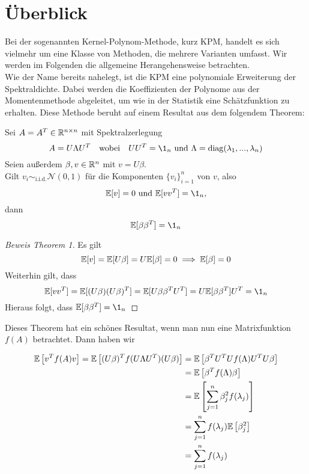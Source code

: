 \section{Überblick}
Bei der sogenannten Kernel-Polynom-Methode, kurz KPM, handelt es sich vielmehr um eine Klasse von Methoden, die mehrere Varianten umfasst.
Wir werden im Folgenden die allgemeine Herangehensweise betrachten.\\
Wie der Name bereits nahelegt, ist die KPM eine polynomiale Erweiterung der Spektraldichte.
Dabei werden die Koeffizienten der Polynome aus der Momentenmethode abgeleitet, um wie in der Statistik eine Schätzfunktion zu erhalten.
Diese Methode beruht auf einem Resultat aus dem folgendem Theorem:


\begin{theorem}
    Sei $A = A^T \in \mathbb{R}^{n \times n}$ mit Spektralzerlegung
    $$A = U \Lambda U^T \quad \text{wobei} \quad UU^T = \1_n \text{ und } \Lambda = \diag(\lambda_1, ..., \lambda_n)$$ 
    Seien außerdem $\beta, v \in \mathbb{R}^n$ mit $v = U\beta$.\\
    Gilt $v_i \sim_\text{i.i.d.} \mathcal{N}(0, 1)$ für die Komponenten $\{v_i\}_{i = 1}^n$ von $v$, also
    \begin{equation} \label{eq:normalverteiltervektor}
        \E[v] = 0 \text{ und } \E[vv^T] = \1_n \text{,}
    \end{equation}
    dann
    $$\E[\beta \beta^T] = \1_n$$
\end{theorem}


\begin{proof}[Beweis Theorem 1]
    Es gilt
    $$\mathbb{E}[v] = \mathbb{E}[U\beta] = U\mathbb{E}[\beta] = 0 \implies \mathbb{E}[\beta] = 0$$
    Weiterhin gilt, dass
    $$\E[vv^T] = \E[(U\beta)(U\beta)^T] = \E[U\beta \beta^TU^T] = U \E[\beta \beta^T]U^T = \1_n$$
    Hieraus folgt, dass $\E[\beta \beta^T] = \1_n$
\end{proof}

\vspace{0.5 cm}
Dieses Theorem hat ein schönes Resultat, wenn man nun eine Matrixfunktion $f(A)$ betrachtet.
Dann haben wir

\begin{align*}
    \mathbb{E}\left[v^Tf(A)v\right] = \mathbb{E}\left[(U\beta)^Tf(U\Lambda U^T)(U\beta)\right] & = \mathbb{E}\left[\beta^TU^TUf(\Lambda)U^TU\beta\right]\\
        & = \mathbb{E}\left[\beta^Tf(\Lambda)\beta\right]\\
        & = \mathbb{E}\left[\sum_{j = 1}^n \beta_j^2 f(\lambda_j) \right]\\
        & = \sum_{j = 1}^n f(\lambda_j) \mathbb{E}\left[ \beta_j^2 \right]\\
        & = \sum_{j = 1}^n f(\lambda_j)
\end{align*}

